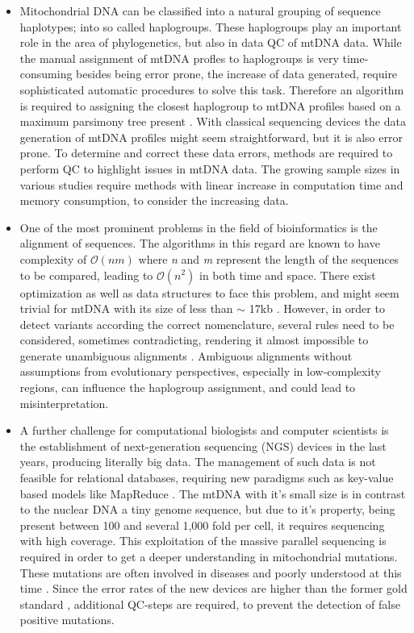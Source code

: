 \begin{itemize}
\item 
Mitochondrial DNA can be classified into a natural grouping of sequence haplotypes; into so called haplogroups. These haplogroups play an important role in the area of phylogenetics, but also in data QC of mtDNA data. While the manual assignment of mtDNA profles to haplogroups is very time-consuming besides being error prone, the increase of data generated, require sophisticated automatic procedures to solve this task. Therefore an algorithm is required to assigning the closest haplogroup to mtDNA profiles based on a maximum parsimony tree present \cite{VanOven2009}. With classical sequencing devices the data generation of mtDNA profiles might seem straightforward, but it is also error prone. To determine and correct these data errors, methods are required to perform QC to highlight issues in mtDNA data. The growing sample sizes in various studies require methods with linear increase in computation time and memory consumption, to consider the increasing data. 
\item 
One of the most prominent problems in the field of bioinformatics is the alignment of sequences. The algorithms in this regard are known to have complexity of $\mathcal O(nm)$ where \textit{n} and \textit{m} represent the length of the sequences to be compared, leading to $\mathcal O(n^2)$ in both time and space. There exist optimization as well as data structures to face this problem, and might seem trivial for mtDNA with its size of less than $\sim$ 17kb \cite{Andrews1999}. However, in order to detect variants according the correct nomenclature, several rules need to be considered, sometimes contradicting, rendering it almost impossible to generate unambiguous alignments \cite{Bandelt2008}. Ambiguous alignments without assumptions from evolutionary perspectives, especially in low-complexity regions, can influence the haplogroup assignment, and could lead to misinterpretation.  
\item 
A further challenge for computational biologists and computer scientists is the establishment of next-generation sequencing (NGS) devices in the last years, producing literally big data. The management of such data is not feasible for relational databases, requiring new paradigms such as key-value based models like MapReduce \cite{Dean2008}. The mtDNA with it's small size is in contrast to the nuclear DNA a tiny genome sequence, but due to it's property, being present between 100 and several 1,000 fold per cell, it requires sequencing with high coverage. This exploitation of the massive parallel sequencing is required in order to get a deeper understanding in mitochondrial mutations. These mutations are often involved in diseases and poorly understood at this time \cite{Wallace2013}. Since the error rates of the new devices are higher than the former gold standard \cite{Wang2011}, additional QC-steps are required, to prevent the detection of false positive mutations. 

\end{itemize}

